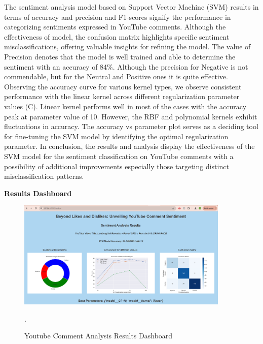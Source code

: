 \documentclass[11pt,article,oneside]{article}
\begin{document}
The sentiment analysis model based on Support Vector Machine (SVM) results in terms of accuracy and precision and F1-scores signify the performance in categorizing sentiments expressed in YouTube comments. Although the effectiveness of model, the confusion matrix highlights specific sentiment misclassifications, offering valuable insights for refining the model. The value of Precision denotes that the model is well trained and able to determine the sentiment with an accuracy of 84\%. Although the precision for Negative is not commendable, but for the Neutral and Positive ones it is quite effective. Observing the accuracy curve for various kernel types, we observe consistent performance with the linear kernel across different regularization parameter values (C). Linear kernel performs well in most of the cases with the accuracy peak at parameter value of 10. However, the RBF and polynomial kernels exhibit fluctuations in accuracy. The accuracy vs parameter plot serves as a deciding tool for fine-tuning the SVM model by identifying the optimal regularization parameter. In conclusion, the results and analysis display the effectiveness of the SVM model for the sentiment classification on YouTube comments with a possibility of additional improvements especially those targeting distinct misclassification patterns.

\newpage
\textbf{Results Dashboard}

\begin{figure}[H]
    \centering
    \includegraphics[width=0.9\textwidth]{images/yt_dashboard.PNG}
    \caption{Youtube Comment Analysis Results Dashboard}.
    \label{fig:results}
\end{figure}

\printbibliography
\end{document}

